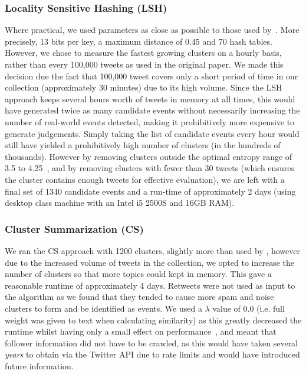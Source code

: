 \subsubsection{Locality Sensitive Hashing (LSH)}
Where practical, we used parameters as close as possible to those used by~\cite{Petrovic:2010:SFS:1857999.1858020}.
More precisely, 13 bits per key, a maximum distance of 0.45 and 70 hash tables.
However, we chose to measure the fastest growing clusters on a hourly basis, rather than every 100,000 tweets as used in the original paper.
We made this decision due the fact that 100,000 tweet covers only a short period of time in our collection (approximately 30 minutes) due to its high volume.
Since the LSH approach keeps several hours worth of tweets in memory at all times, this would have generated twice as many candidate events without necessarily increasing the number of real-world events detected, making it prohibitively more expensive to generate judgements.
Simply taking the list of candidate events every hour would still have yielded a prohibitively high number of clusters (in the hundreds of thousands).
However by removing clusters outside the optimal entropy range of 3.5 to 4.25~\citep{Petrovic:2010:SFS:1857999.1858020}, and by removing clusters with fewer than 30 tweets (which ensures the cluster contains enough tweets for effective evaluation), we are left with a final set of 1340 candidate events and a run-time of approximately 2 days (using desktop class machine with an Intel i5 2500S and 16GB RAM).

\subsubsection{Cluster Summarization (CS)}
We ran the CS approach with 1200 clusters, slightly more than used by \cite{Aggarwal12}, however due to the increased volume of tweets in the collection, we opted to increase the number of clusters so that more topics could kept in memory.
This gave a reasonable runtime of approximately 4 days.
Retweets were not used as input to the algorithm as we found that they tended to cause more spam and noise clusters to form and be identified as events.
We used a \(\lambda\) value of 0.0 (i.e. full weight was given to text when calculating similarity) as this greatly decreased the runtime whilst having only a small effect on performance~\citep{Aggarwal12}, and meant that follower information did not have to be crawled, as this would have taken several \emph{years} to obtain via the Twitter API due to rate limits and would have introduced future information.

